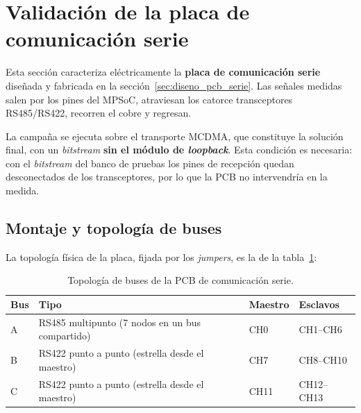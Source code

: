 
\section{Validación de la placa de comunicación serie} \label{sec:validacion_propia}

Esta sección caracteriza eléctricamente la \textbf{placa de comunicación serie} diseñada y
fabricada en la sección~\ref{sec:diseno_pcb_serie}. Las señales medidas salen por los pines
del MPSoC, atraviesan los catorce transceptores RS485/RS422, recorren el cobre y regresan.

La campaña se ejecuta sobre el transporte MCDMA, que constituye la solución final, con un
\textit{bitstream} \textbf{sin el módulo de \textit{loopback}}. Esta condición es necesaria: con el
\textit{bitstream} del banco de pruebas los pines de recepción quedan desconectados de los
transceptores, por lo que la PCB no intervendría en la medida.

\subsection{Montaje y topología de buses}

La topología física de la placa, fijada por los \textit{jumpers}, es la de la
tabla~\ref{tab:pcb_topologia}:

\begin{table}[H]
    \centering
    \begin{tabular}{llll}
        \hline
        \textbf{Bus} & \textbf{Tipo} & \textbf{Maestro} & \textbf{Esclavos} \\
        \hline
        A & RS485 multipunto (7 nodos en un bus compartido) & CH0  & CH1--CH6 \\
        B & RS422 punto a punto (estrella desde el maestro) & CH7  & CH8--CH10 \\
        C & RS422 punto a punto (estrella desde el maestro) & CH11 & CH12--CH13 \\
        \hline
    \end{tabular}
    \caption{Topología de buses de la PCB de comunicación serie.}
    \label{tab:pcb_topologia}
\end{table}

